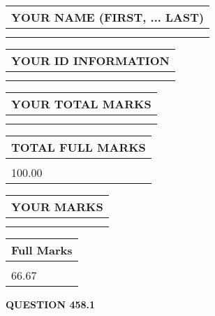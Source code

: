 \documentclass{ctexart}
\begin{document}
   
   
   
\newpage 
\setcounter{page}{ 
   458001 } 
   
   
   
   
\noindent\begin{tabular}{|l|}
\hline
YOUR NAME (FIRST, ... LAST)  \\
\hline
 \\ 
 \\ 
\hline
\end{tabular}
\hspace{0.05in} \begin{tabular}{|l|}
\hline
 YOUR   ID   INFORMATION  \\
\hline
 \\ 
 \\ 
\hline
\end{tabular}
   
   
\vspace{0.2in}\noindent\begin{tabular}{|l|}
\hline
YOUR TOTAL MARKS  \\
\hline
 \\ 
 \\ 
\hline
\end{tabular}
\hspace{0.05in} \begin{tabular}{|l|}
\hline
TOTAL FULL MARKS  \\
\hline
 \\ 
100.00 \\
\hline
\end{tabular}
   
   
 \vspace{0.2in}
 
 
 
 
   
   
  
\vspace{0.2in}
  
\noindent\begin{tabular}{|l|}
\hline
 YOUR MARKS  \\
\hline
 \\ 
 \\ 
\hline
\end{tabular}
\hspace{0.05in} \begin{tabular}{|l|}
\hline
 Full Marks  \\
\hline
 \\ 
66.67 \\
\hline
\end{tabular}
{\textbf{\Large{QUESTION
458.1 
}}}
  
\end{document}

